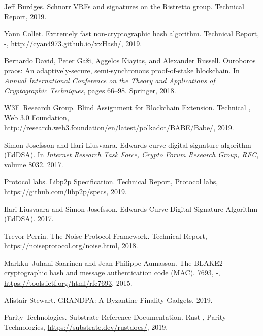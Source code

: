 \documentclass{book}
\newcommand{\tmtextit}[1]{{\itshape{#1}}}
\providecommand{\tmtextit}[1]{\tmtextit{#1}}
\begin{document}
\begin{thebibliography}{DGKR18}
  Jeff Burdges. {\newblock}Schnorr VRFs
  and signatures on the Ristretto group. {\newblock}Technical Report,
  2019.{\newblock}
  
  Yann Collet. {\newblock}Extremely fast
  non-cryptographic hash algorithm. {\newblock}Technical Report, -,
  \url{http://cyan4973.github.io/xxHash/}, 2019.{\newblock}
  
  Bernardo David, Peter Ga{\v z}i,
  Aggelos Kiayias, and  Alexander Russell. {\newblock}Ouroboros praos: An
  adaptively-secure, semi-synchronous proof-of-stake blockchain. {\newblock}In
  \tmtextit{Annual International Conference on the Theory and Applications of
  Cryptographic Techniques},  pages  66--98. Springer, 2018.{\newblock}
  
  W3F~Research Group.
  {\newblock}Blind Assignment for Blockchain Extension. {\newblock}Technical
  {}, Web 3.0 Foundation,
  \url{http://research.web3.foundation/en/latest/polkadot/BABE/Babe/},
  2019.{\newblock}
  
  Simon Josefsson  and  Ilari
  Liusvaara. {\newblock}Edwards-curve digital signature algorithm (EdDSA).
  {\newblock}In \tmtextit{Internet Research Task Force, Crypto Forum Research
  Group, RFC},  volume  8032. 2017.{\newblock}
  
  Protocol labs. {\newblock}Libp2p
  Specification. {\newblock}Technical Report, Protocol labs,
  \url{https://github.com/libp2p/specs}, 2019.{\newblock}
  
  Ilari Liusvaara  and  Simon
  Josefsson. {\newblock}Edwards-Curve Digital Signature Algorithm (EdDSA).
  {\newblock}2017.{\newblock}
  
  Trevor Perrin. {\newblock}The Noise
  Protocol Framework. {\newblock}Technical Report,
  \url{https://noiseprotocol.org/noise.html}, 2018.{\newblock}
  
  Markku~Juhani Saarinen  and 
  Jean-Philippe Aumasson. {\newblock}The BLAKE2 cryptographic hash and message
  authentication code (MAC). {\newblock}{} 7693, -,
  \url{https://tools.ietf.org/html/rfc7693}, 2015.{\newblock}
  
  Alistair Stewart. {\newblock}GRANDPA:
  A Byzantine Finality Gadgets. {\newblock}2019.{\newblock}
  
  Parity Technologies.
  {\newblock}Substrate Reference Documentation. {\newblock}Rust
  {}, Parity Technologies,
  \url{https://substrate.dev/rustdocs/}, 2019.{\newblock}
\end{thebibliography}

\printindex
\end{document}
